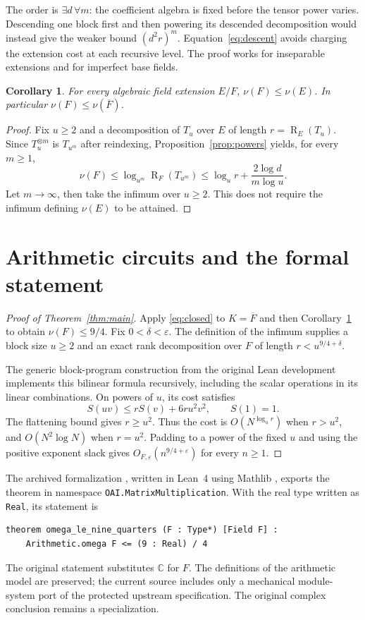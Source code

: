 \documentclass[11pt]{article}
\newtheorem{corollary}[theorem]{Corollary}
\theoremstyle{remark}
\DeclareMathOperator{\rank}{R}
\newcommand{\C}{\mathbb C}
\newcommand{\eps}{\varepsilon}
\numberwithin{equation}{section}
\begin{document}
The order is $\exists d\,\forall m$: the coefficient algebra is
fixed before the tensor power varies. Descending one block first
and then powering its descended decomposition would instead give
the weaker bound $(d^2r)^m$. Equation~\eqref{eq:descent} avoids
charging the extension cost at each recursive level. The proof
works for inseparable extensions and for imperfect base fields.

\begin{corollary}\label{cor:exponent}
For every algebraic field extension $E/F$,
$\nu(F)\leq\nu(E)$. In particular $\nu(F)\leq\nu(\overline F)$.
\end{corollary}
\begin{proof}
Fix $u\geq2$ and a decomposition of $T_u$ over $E$ of length
$r=\rank_E(T_u)$. Since $T_u^{\otimes m}$ is $T_{u^m}$ after
reindexing, Proposition~\ref{prop:powers} yields, for every $m\geq1$,
\[
\nu(F)\leq\log_{u^m}\rank_F(T_{u^m})
\leq\log_u r+\frac{2\log d}{m\log u}.
\]
Let $m\to\infty$, then take the infimum over $u\geq2$.
This does not require the infimum defining $\nu(E)$ to be attained.
\end{proof}

\section{Arithmetic circuits and the formal statement}

\begin{proof}[Proof of Theorem~\ref{thm:main}]
Apply \eqref{eq:closed} to $K=\overline F$ and then
Corollary~\ref{cor:exponent} to obtain $\nu(F)\leq9/4$.
Fix $0<\delta<\eps$. The definition of the infimum supplies a
block size $u\geq2$ and an exact rank decomposition over $F$ of
length $r<u^{9/4+\delta}$.

The generic block-program construction from the original Lean
development \cite{OAILean} implements this bilinear formula
recursively, including the scalar operations in its linear
combinations. On powers of $u$, its cost satisfies
\[
S(uv)\leq rS(v)+6ru^2v^2,\qquad S(1)=1.
\]
The flattening bound gives $r\geq u^2$. Thus the cost is
$O(N^{\log_u r})$ when $r>u^2$, and $O(N^2\log N)$ when $r=u^2$.
Padding to a power of the fixed $u$ and using the positive exponent
slack gives $O_{F,\eps}(n^{9/4+\eps})$ for every $n\geq1$.
\end{proof}

The archived formalization \cite{Formalization}, written in Lean~4
\cite{Lean} using Mathlib \cite{Mathlib}, exports the theorem
in namespace \texttt{OAI.MatrixMultiplication}. With the real type
written as \texttt{Real}, its statement is
\begin{verbatim}
theorem omega_le_nine_quarters (F : Type*) [Field F] :
    Arithmetic.omega F <= (9 : Real) / 4
\end{verbatim}
The original statement substitutes $\C$ for $F$. The definitions
of the arithmetic model are preserved; the current source includes
only a mechanical module-system port of the protected upstream
specification. The original complex conclusion remains a specialization.
\end{document}

